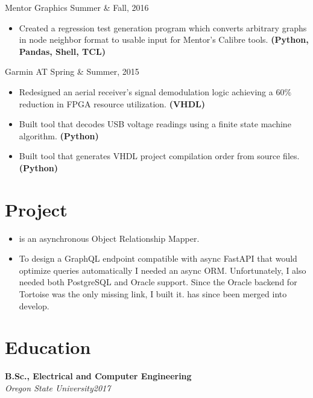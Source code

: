 \documentclass[]{friggeri-cv}
\begin{document}
         {Mentor Graphics}
         {Summer \& Fall, 2016}
         \begin{itemize}
           \item Created a regression test generation program which converts arbitrary 
                 graphs in node neighbor format to usable input for Mentor's Calibre tools. {\bf\footnotesize(Python, Pandas, Shell, TCL)}
        \end{itemize}

         {Garmin AT}
         {Spring \& Summer, 2015}
         \begin{itemize}
           \item Redesigned an aerial receiver's signal demodulation logic achieving a 
                 $60\%$ reduction in FPGA resource utilization. {\bf\footnotesize(VHDL)}
           \item Built tool that decodes USB voltage readings using a finite state machine algorithm. {\bf\footnotesize(Python)}
           \item Built tool that generates VHDL project compilation order from source files. {\bf\footnotesize(Python)}
         \end{itemize}

\section{Project}  
         \begin{itemize}
           \item {} is an asynchronous Object Relationship Mapper.
           \item To design a GraphQL endpoint compatible with async FastAPI that would optimize queries automatically I needed an async ORM.
                 Unfortunately, I also needed both PostgreSQL and Oracle support. Since the Oracle backend for Tortoise was the only
                 missing link, I built it.  has since been merged into develop.
         \end{itemize} 

\section{Education}
    \textbf{B.Sc., Electrical and Computer Engineering} \\
    \textit{{Oregon State University}\hfill 2017 }
\end{document}
